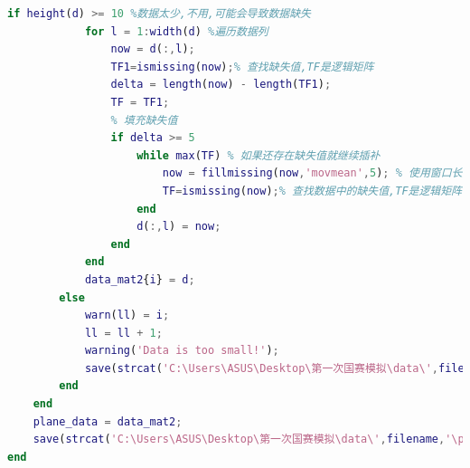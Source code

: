 \documentclass{my_paper}
\begin{document}
\begin{lstlisting}[language=matlab]
        if height(d) >= 10 %数据太少,不用,可能会导致数据缺失
            for l = 1:width(d) %遍历数据列
                now = d(:,l);
                TF1=ismissing(now);% 查找缺失值,TF是逻辑矩阵 
                delta = length(now) - length(TF1);
                TF = TF1;
                % 填充缺失值
                if delta >= 5
                    while max(TF) % 如果还存在缺失值就继续插补
                        now = fillmissing(now,'movmean',5); % 使用窗口长度为 5 的移动均值替换数据中的 NaN 值 
                        TF=ismissing(now);% 查找数据中的缺失值,TF是逻辑矩阵，利用TF可以找到now内的缺失值
                    end
                    d(:,l) = now;
                end
            end
            data_mat2{i} = d;
        else
            warn(ll) = i;
            ll = ll + 1;
            warning('Data is too small!');
            save(strcat('C:\Users\ASUS\Desktop\第一次国赛模拟\data\',filename,'\warn.mat'),'warn');
        end
    end 
    plane_data = data_mat2;
    save(strcat('C:\Users\ASUS\Desktop\第一次国赛模拟\data\',filename,'\plane_data.mat'),'plane_data');
end

\end{lstlisting}
\end{document}

